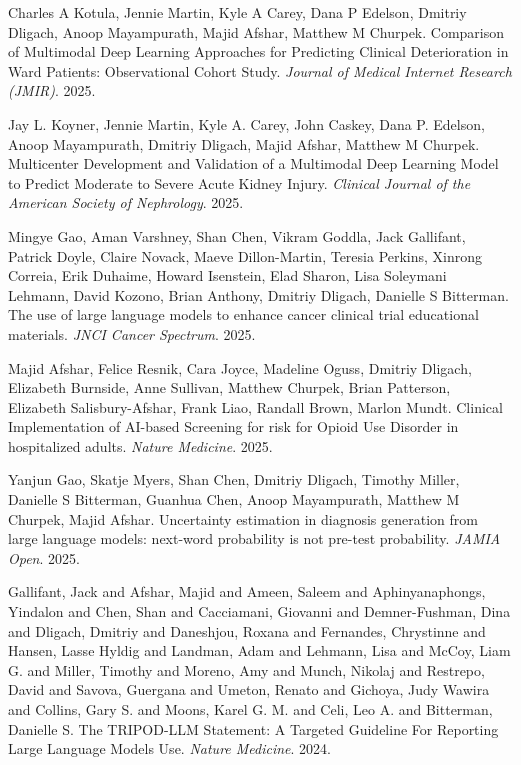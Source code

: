\documentclass[letterpaper]{article}
\renewenvironment{itemize}{
  \begin{list}{}{
    \setlength{\leftmargin}{1.5em}
  }
}{
  \end{list}
}
\begin{document}
\begin{itemize}
\item Charles A Kotula, Jennie Martin, Kyle A Carey, Dana P Edelson, Dmitriy Dligach, Anoop Mayampurath, Majid Afshar, Matthew M Churpek. Comparison of Multimodal Deep Learning Approaches for Predicting Clinical Deterioration in Ward Patients: Observational Cohort Study. \emph{Journal of Medical Internet Research (JMIR)}. 2025.
\item Jay L. Koyner, Jennie Martin, Kyle A. Carey, John Caskey, Dana P. Edelson, Anoop Mayampurath, Dmitriy Dligach, Majid Afshar, Matthew M Churpek. Multicenter Development and Validation of a Multimodal Deep Learning Model to Predict Moderate to Severe Acute Kidney Injury. \emph{Clinical Journal of the American Society of Nephrology}. 2025.
\item Mingye Gao, Aman Varshney, Shan Chen, Vikram Goddla, Jack Gallifant, Patrick Doyle, Claire Novack, Maeve Dillon-Martin, Teresia Perkins, Xinrong Correia, Erik Duhaime, Howard Isenstein, Elad Sharon, Lisa Soleymani Lehmann, David Kozono, Brian Anthony, Dmitriy Dligach, Danielle S Bitterman. The use of large language models to enhance cancer clinical trial educational materials. \emph{JNCI Cancer Spectrum}. 2025.
\item Majid Afshar, Felice Resnik, Cara Joyce, Madeline Oguss, Dmitriy Dligach, Elizabeth Burnside, Anne Sullivan, Matthew Churpek, Brian Patterson, Elizabeth Salisbury-Afshar, Frank Liao, Randall Brown, Marlon Mundt. Clinical Implementation of AI-based Screening for risk for Opioid Use Disorder in hospitalized adults. \emph{Nature Medicine}. 2025.
\item Yanjun Gao, Skatje Myers, Shan Chen, Dmitriy Dligach, Timothy Miller, Danielle S Bitterman, Guanhua Chen, Anoop Mayampurath, Matthew M Churpek, Majid Afshar. Uncertainty estimation in diagnosis generation from large language models: next-word probability is not pre-test probability. \emph{JAMIA Open}. 2025.
\item Gallifant, Jack and Afshar, Majid and Ameen, Saleem and Aphinyanaphongs, Yindalon and Chen, Shan and Cacciamani, Giovanni and Demner-Fushman, Dina and Dligach, Dmitriy and Daneshjou, Roxana and Fernandes, Chrystinne and Hansen, Lasse Hyldig and Landman, Adam and Lehmann, Lisa and McCoy, Liam G. and Miller, Timothy and Moreno, Amy and Munch, Nikolaj and Restrepo, David and Savova, Guergana and Umeton, Renato and Gichoya, Judy Wawira and Collins, Gary S. and Moons, Karel G. M. and Celi, Leo A. and Bitterman, Danielle S. The TRIPOD-LLM Statement: A Targeted Guideline For Reporting Large Language Models Use. \emph{Nature Medicine}. 2024.

\end{itemize}
\end{document}
